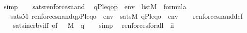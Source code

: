 \begin{isabellebody}
\ simp\isanewline
\ \ \isamarkupfalse%
\isanewline
{}\isamarkupfalse%
%
\endisatagproof
{\isafoldproof}%
%
\isadelimproof
\isanewline
%
\endisadelimproof
\isanewline
{}\isamarkupfalse%
\ sats{\isacharunderscore}{\kern0pt}ren{\isacharunderscore}{\kern0pt}forces{\isacharunderscore}{\kern0pt}nand{\isacharcolon}{\kern0pt}\isanewline
\ \ {\isachardoublequoteopen}{\isacharbrackleft}{\kern0pt}q{\isacharcomma}{\kern0pt}P{\isacharcomma}{\kern0pt}leq{\isacharcomma}{\kern0pt}o{\isacharcomma}{\kern0pt}p{\isacharbrackright}{\kern0pt}\ {\isacharat}{\kern0pt}\ env\ {\isasymin}\ list{\isacharparenleft}{\kern0pt}M{\isacharparenright}{\kern0pt}\ {\isasymLongrightarrow}\ {\isasymphi}{\isasymin}formula\ {\isasymLongrightarrow}\isanewline
\ \ \ sats{\isacharparenleft}{\kern0pt}M{\isacharcomma}{\kern0pt}\ ren{\isacharunderscore}{\kern0pt}forces{\isacharunderscore}{\kern0pt}nand{\isacharparenleft}{\kern0pt}{\isasymphi}{\isacharparenright}{\kern0pt}{\isacharcomma}{\kern0pt}{\isacharbrackleft}{\kern0pt}q{\isacharcomma}{\kern0pt}p{\isacharcomma}{\kern0pt}P{\isacharcomma}{\kern0pt}leq{\isacharcomma}{\kern0pt}o{\isacharbrackright}{\kern0pt}\ {\isacharat}{\kern0pt}\ env{\isacharparenright}{\kern0pt}\ {\isasymlongleftrightarrow}\ sats{\isacharparenleft}{\kern0pt}M{\isacharcomma}{\kern0pt}\ {\isasymphi}{\isacharcomma}{\kern0pt}{\isacharbrackleft}{\kern0pt}q{\isacharcomma}{\kern0pt}P{\isacharcomma}{\kern0pt}leq{\isacharcomma}{\kern0pt}o{\isacharbrackright}{\kern0pt}\ {\isacharat}{\kern0pt}\ env{\isacharparenright}{\kern0pt}{\isachardoublequoteclose}\isanewline
%
\isadelimproof
\ \ %
\endisadelimproof
%
\isatagproof
{}\isamarkupfalse%
\ ren{\isacharunderscore}{\kern0pt}forces{\isacharunderscore}{\kern0pt}nand{\isacharunderscore}{\kern0pt}def\isanewline
\ \ \isamarkupfalse%
\ sats{\isacharunderscore}{\kern0pt}incr{\isacharunderscore}{\kern0pt}bv{\isacharunderscore}{\kern0pt}iff\ {\isacharbrackleft}{\kern0pt}of\ {\isacharunderscore}{\kern0pt}\ {\isacharunderscore}{\kern0pt}\ M\ {\isacharunderscore}{\kern0pt}\ {\isachardoublequoteopen}{\isacharbrackleft}{\kern0pt}q{\isacharbrackright}{\kern0pt}{\isachardoublequoteclose}{\isacharbrackright}{\kern0pt}\isanewline
\ \ \isamarkupfalse%
\ simp%
\endisatagproof
{\isafoldproof}%
%
\isadelimproof
\isanewline
%
\endisadelimproof
\isanewline
\isanewline
{}\isamarkupfalse%
\isanewline
\ \ ren{\isacharunderscore}{\kern0pt}forces{\isacharunderscore}{\kern0pt}forall\ {\isacharcolon}{\kern0pt}{\isacharcolon}{\kern0pt}\ {\isachardoublequoteopen}i{\isasymRightarrow}i{\isachardoublequoteclose}\ \isanewline

\end{isabellebody}
